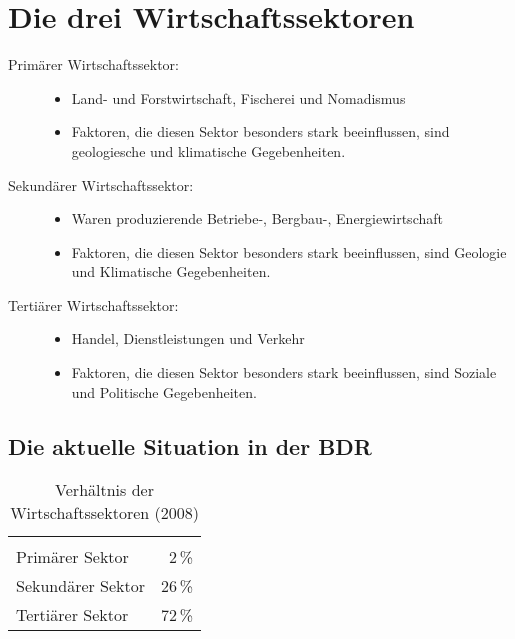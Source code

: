\section{Die drei Wirtschaftssektoren}
\begin{description}
	\item[Primärer Wirtschaftssektor:]
	\begin{itemize}
		\item Land- und Forstwirtschaft, Fischerei und Nomadismus
		\item Faktoren, die diesen Sektor besonders stark beeinflussen, sind geologiesche und klimatische Gegebenheiten.
	\end{itemize}
	\item[Sekundärer Wirtschaftssektor:]
	\begin{itemize}
		\item Waren produzierende Betriebe-, Bergbau-, Energiewirtschaft
		\item Faktoren, die diesen Sektor besonders stark beeinflussen, sind Geologie und Klimatische Gegebenheiten.
	\end{itemize}
	\item[Tertiärer Wirtschaftssektor:]
	\begin{itemize}
		\item Handel, Dienstleistungen und Verkehr
		\item Faktoren, die diesen Sektor besonders stark beeinflussen, sind Soziale und Politische Gegebenheiten.
	\end{itemize}
\end{description}



\subsection{Die aktuelle Situation in der BDR}
\begin{longtable}{lr}
	\caption{Verhältnis der Wirtschaftssektoren (2008)}
	\endlastfoot
	\multicolumn{2}{r}{\longtableendfoot} \\
	\endfoot

	Primärer Sektor & 2\,\% \\
	Sekundärer Sektor & 26\,\% \\
	Tertiärer Sektor & 72\,\% \\
\end{longtable}

